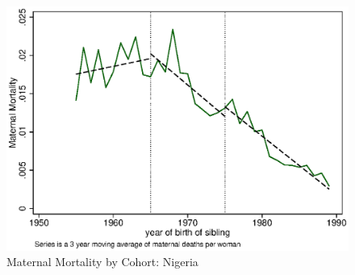 \documentclass[10pt,letterpaper,subeqn, xcolor=table]{beamer}
\begin{document}
\begin{frame}[label=NIGERIA_MMR]
\begin{figure}[!htbp]
\begin{center}
\includegraphics[scale=0.7]{./figures/Nigeria_mmr.eps}
\caption{Maternal Mortality by Cohort: Nigeria}
\end{center}
\end{figure}
\hyperlink{ZIMBABWE_MMR}{}
\end{frame}
\end{document}
